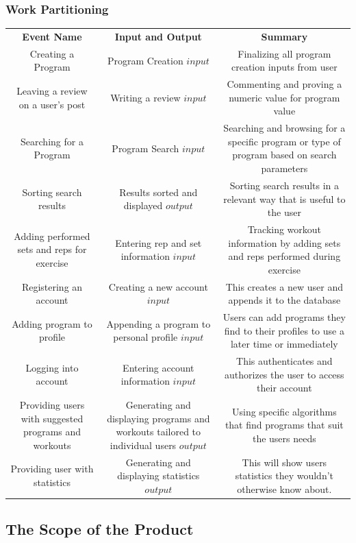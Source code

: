 \documentclass[12pt]{article}
\begin{document}
	\subsubsection{Work Partitioning}
	\begin{center}
    \begin{tabular}{ |c|c|c| } 
     \hline
     \textbf{Event Name} & \textbf{Input and Output} & \textbf{Summary} \\ 
     Creating a Program  & Program Creation \(input\) & Finalizing all program creation inputs from user  \\ 
     Leaving a review on a user's post & Writing a review \(input\) & Commenting and proving a numeric value for program value \\
     Searching for a Program & Program Search \(input\) & Searching and browsing for a specific program or type of program based on search parameters  \\ 
     Sorting search results & Results sorted and displayed \(output\) & Sorting search results in a relevant way that is useful to the user \\ 
     Adding performed sets and reps for exercise & Entering rep and set information \(input\) & Tracking workout information by adding sets and reps performed during exercise \\ 
     Registering an account & Creating a new account \(input\) & This creates a new user and appends it to the database \\ 
     Adding program to profile  & Appending a program to personal profile \(input\) & Users can add programs they find to their profiles to use a later time or immediately \\ 
     Logging into account & Entering account information \(input\) & This authenticates and authorizes the user to access their account  \\ 
     Providing users with suggested programs and workouts & Generating and displaying programs and workouts tailored to individual users \(output\) & Using specific algorithms that find programs that suit the users needs \\ 
     Providing user with statistics & Generating and displaying statistics \(output\) & This will show users statistics they wouldn't otherwise know about. \\ 
     \hline
    \end{tabular}
    \end{center}
	\subsection{The Scope of the Product}
\end{document}
